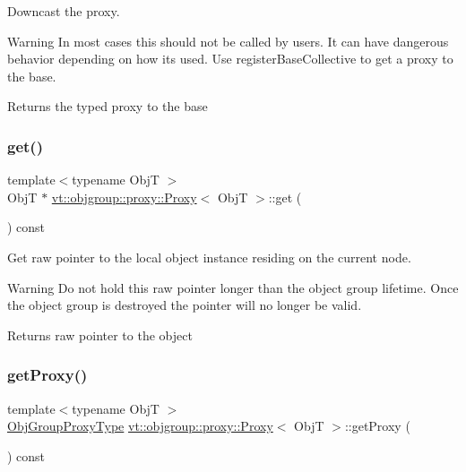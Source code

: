 Downcast the proxy. 

\begin{DoxyWarning}{Warning}
In most cases this should not be called by users. It can have dangerous behavior depending on how its used. Use {\ttfamily register\+Base\+Collective} to get a proxy to the base.
\end{DoxyWarning}
\begin{DoxyReturn}{Returns}
the typed proxy to the base 
\end{DoxyReturn}
\mbox{\label{structvt_1_1objgroup_1_1proxy_1_1_proxy_a62eef779c097c8398e249827e4ad7c6a}} 
\subsubsection{\texorpdfstring{get()}{get()}}
{\footnotesize\ttfamily template$<$typename ObjT $>$ \\
ObjT $\ast$ \hyperlink{structvt_1_1objgroup_1_1proxy_1_1_proxy}{vt\+::objgroup\+::proxy\+::\+Proxy}$<$ ObjT $>$\+::get (\begin{DoxyParamCaption}{ }\end{DoxyParamCaption}) const}



Get raw pointer to the local object instance residing on the current node. 

\begin{DoxyWarning}{Warning}
Do not hold this raw pointer longer than the object group lifetime. Once the object group is destroyed the pointer will no longer be valid.
\end{DoxyWarning}
\begin{DoxyReturn}{Returns}
raw pointer to the object 
\end{DoxyReturn}
\mbox{\label{structvt_1_1objgroup_1_1proxy_1_1_proxy_a76cda2351cf7801abe2ebffa1403c5b8}} 
\subsubsection{\texorpdfstring{get\+Proxy()}{getProxy()}}
{\footnotesize\ttfamily template$<$typename ObjT $>$ \\
\hyperlink{namespacevt_ad7cae989df485fccca57f0792a880a8e}{Obj\+Group\+Proxy\+Type} \hyperlink{structvt_1_1objgroup_1_1proxy_1_1_proxy}{vt\+::objgroup\+::proxy\+::\+Proxy}$<$ ObjT $>$\+::get\+Proxy (\begin{DoxyParamCaption}{ }\end{DoxyParamCaption}) const}



